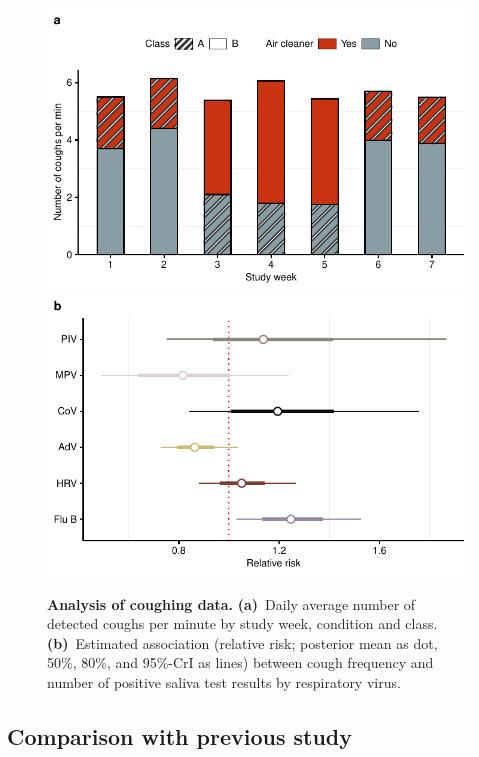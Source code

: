 \documentclass[fleqn,11pt]{wlscirep}
\begin{document}
\begin{figure}[!htpb]
    \centering
    \includegraphics{results/cough-data/coughs-frequency-per-week.pdf}
    \includegraphics{results/cough-data/coughs-virus-association.pdf}
    \caption{\textbf{Analysis of coughing data.} \textbf{(a)}~Daily average number of detected coughs per minute by study week, condition and class. \textbf{(b)}~Estimated association (relative risk; posterior mean as dot, 50\%, 80\%, and 95\%-CrI as lines) between cough frequency and number of positive saliva test results by respiratory virus.}
    \label{fig:coughing}
\end{figure}

\subsection{Comparison with previous study}
\end{document}
